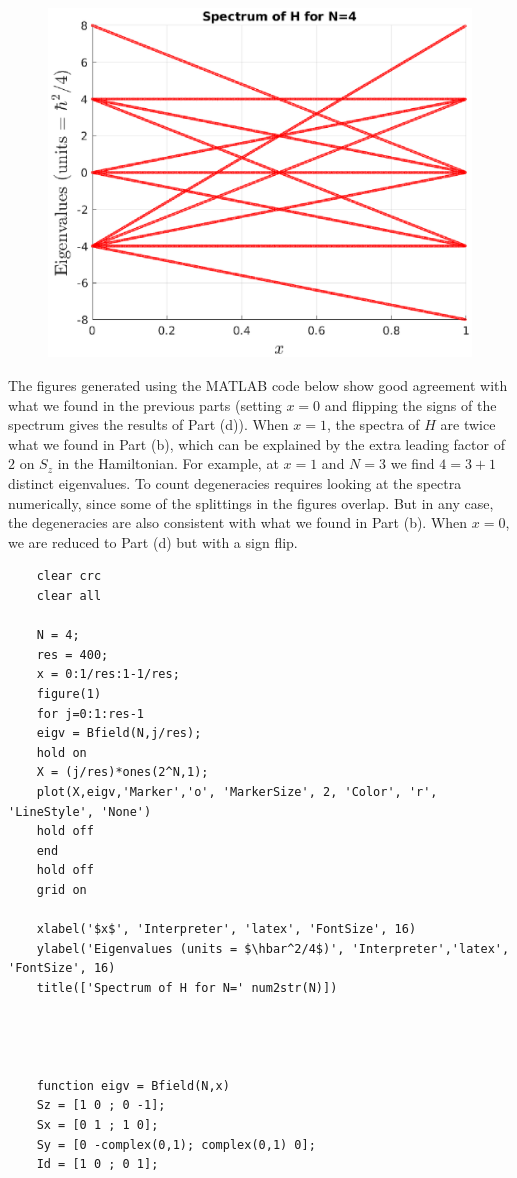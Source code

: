 \documentclass{article}
\theoremstyle{definition}
\begin{document}
\begin{enumerate}[label=(\alph*)]
\begin{figure}[!htb]
\begin{minipage}{0.49\textwidth}
			\includegraphics[width=\textwidth]{2g_N4.eps}
		\end{minipage}
	\end{figure}

	The figures generated using the MATLAB code below show good agreement with what we found in the previous parts (setting $x=0$ and flipping the signs of the spectrum gives the results of Part (d)). When $x=1$, the spectra of $H$ are twice what we found in Part (b), which can be explained by the extra leading factor of $2$ on $S_z$ in the Hamiltonian. For example, at $x=1$ and $N=3$ we find $4=3+1$ distinct eigenvalues. To count degeneracies requires looking at the spectra numerically, since some of the splittings in the figures overlap. But in any case, the degeneracies are also consistent with what we found in Part (b). When $x=0$, we are reduced to Part (d) but with a sign flip. 
	\begin{lstlisting}
	clear crc
	clear all
	
	N = 4;
	res = 400;
	x = 0:1/res:1-1/res;
	figure(1)
	for j=0:1:res-1
	eigv = Bfield(N,j/res); 
	hold on
	X = (j/res)*ones(2^N,1);
	plot(X,eigv,'Marker','o', 'MarkerSize', 2, 'Color', 'r', 'LineStyle', 'None')
	hold off
	end
	hold off
	grid on
	
	xlabel('$x$', 'Interpreter', 'latex', 'FontSize', 16)
	ylabel('Eigenvalues (units = $\hbar^2/4$)', 'Interpreter','latex', 'FontSize', 16)
	title(['Spectrum of H for N=' num2str(N)])
	
	
	
	
	function eigv = Bfield(N,x)
	Sz = [1 0 ; 0 -1];
	Sx = [0 1 ; 1 0];
	Sy = [0 -complex(0,1); complex(0,1) 0];
	Id = [1 0 ; 0 1];
	

\end{lstlisting}
\end{enumerate}
\end{document}
